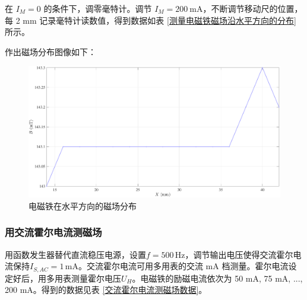\documentclass[UTF8]{article}
\theoremstyle{MyLineTheoremStyle} %
\theoremstyle{MyBlockTheoremStyle} %
\theoremstyle{MySubsubsectionStyle} %
\begin{document}
在 $I_M = 0$ 的条件下，调零毫特计。调节 $I_M = 200 \ \mathrm{mA}$，不断调节移动尺的位置，每 2 mm 记录毫特计读数值，得到数据如表 \ref{测量电磁铁磁场沿水平方向的分布} 所示。
\begin{table}[H]\centering
    \caption{测量电磁铁磁场沿水平方向的分布}
    \label{测量电磁铁磁场沿水平方向的分布}
\end{table}
作出磁场分布图像如下：
\begin{figure}[H]\centering
    \includegraphics[width=0.9\columnwidth]{assets/1/4.pdf}
    \caption{电磁铁在水平方向的磁场分布}
\end{figure}

\subsubsection{用交流霍尔电流测磁场}
用函数发生器替代直流稳压电源，设置$ f=500\,\mathrm{Hz} $，调节输出电压使得交流霍尔电流保持$ I_{S, AC}= 1\,\mathrm{mA} $。交流霍尔电流可用多用表的交流 mA 档测量。霍尔电流设定好后，用多用表测量霍尔电压$ U_H $。电磁铁的励磁电流依次为 50 mA, 75 mA, ..., 200 mA。得到的数据见表 \ref{交流霍尔电流测磁场数据}。
\end{document}
